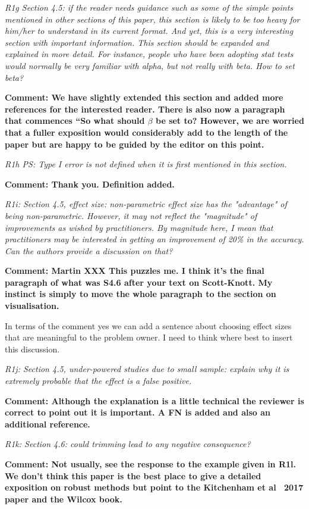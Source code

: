 \documentclass[preprint,10pt]{elsarticle}
\newcommand{\RED}{\color{red}}
\newcommand{\BLACK}{\color{black}}
\begin{document}
{\em R1g Section 4.5: if the reader needs guidance such as some of the simple points mentioned in other sections of this paper, this section is likely to be too heavy for him/her to understand in its current format. And yet, this is a very interesting section with important information. This section should be expanded and explained in more detail. For instance, people who have been adopting stat tests would normally be very familiar with alpha, but not really with beta. How to set beta?}

{\bf Comment: We have slightly extended this section and added more references for the interested reader.  There is also now a paragraph that commences ``So what should $\beta$ be set to? However, we are worried that a fuller exposition would considerably add to the length of the paper but are happy to be guided by the editor on this point.
}

{\em R1h PS: Type I error is not defined when it is first mentioned in this section. }

{\bf Comment: Thank you.  Definition added.
}

{\em R1i: Section 4.5, effect size: non-parametric effect size has the "advantage" of being non-parametric. However, it may not reflect the "magnitude" of improvements as wished by practitioners. By magnitude here, I mean that practitioners may be interested in getting an improvement of 20\% in the accuracy. Can the authors provide a discussion on that?}

{\bf Comment: Martin XXX  \RED This puzzles me.  I think it's the final paragraph of what was S4.6 after your text on Scott-Knott.  My instinct is simply to move the whole paragraph to the section on visualisation. \BLACK

In terms of the comment yes we can add a sentence about choosing effect sizes that are meaningful to the problem owner.  I need to think where best to insert this discussion.
}

{\em R1j: Section 4.5, under-powered studies due to small sample: explain why it is extremely probable that the effect is a false positive. }

{\bf Comment: Although the explanation is a little technical the reviewer is correct to point out it is important.  A FN is added and also an additional reference.}


{\em R1k:  Section 4.6: could trimming lead to any negative consequence?}

{\bf Comment: Not usually, see the response to the example given in R1l. We don't think this paper is the best place to give a detailed exposition on robust methods but point to the Kitchenham et al~ 2017 paper and the Wilcox book.
}
\end{document}
